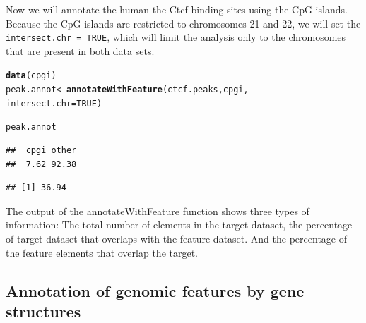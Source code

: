 \documentclass{article}\usepackage[]{graphicx}\usepackage[]{color}
\makeatletter
\newcommand{\hlnum}[1]{\textcolor[rgb]{0.686,0.059,0.569}{#1}}%
\newcommand{\hlstd}[1]{\textcolor[rgb]{0.345,0.345,0.345}{#1}}%
\newcommand{\hlkwb}[1]{\textcolor[rgb]{0.69,0.353,0.396}{#1}}%
\newcommand{\hlkwc}[1]{\textcolor[rgb]{0.333,0.667,0.333}{#1}}%
\newcommand{\hlkwd}[1]{\textcolor[rgb]{0.737,0.353,0.396}{\textbf{#1}}}%
\newenvironment{kframe}{%
 \def\at@end@of@kframe{}%
 \ifinner\ifhmode%
  \def\at@end@of@kframe{\end{minipage}}%
  \begin{minipage}{\columnwidth}%
 \fi\fi%
 \def\FrameCommand##1{\hskip\@totalleftmargin \hskip-\fboxsep
 \colorbox{shadecolor}{##1}\hskip-\fboxsep
     \hskip-\linewidth \hskip-\@totalleftmargin \hskip\columnwidth}%
 \MakeFramed {\advance\hsize-\width
   \@totalleftmargin\z@ \linewidth\hsize
   \@setminipage}}%
 {\par\unskip\endMakeFramed%
 \at@end@of@kframe}
\newenvironment{knitrout}{}{} %
\newcommand{\Rcode}[1]{{\texttt{#1}}}
\makeatother
\begin{document}
Now we will annotate the human the Ctcf binding sites using the CpG islands.
Because the CpG islands are restricted to chromosomes 21 and 22, we will set the
\Rcode{intersect.chr = TRUE}, which will limit the analysis only to the 
chromosomes that are present in both data sets.
\begin{knitrout}
\color{fgcolor}\begin{kframe}
\begin{alltt}
\hlkwd{data}\hlstd{(cpgi)}
\hlstd{peak.annot} \hlkwb{<-} \hlkwd{annotateWithFeature}\hlstd{(ctcf.peaks, cpgi,}
    \hlkwc{intersect.chr} \hlstd{=} \hlnum{TRUE}\hlstd{)}
\end{alltt}


{\ttfamily\noindent\itshape\color{messagecolor}{\#\# intersecting chromosomes...}}\begin{alltt}
\hlstd{peak.annot}
\end{alltt}


{\ttfamily\noindent\itshape\color{messagecolor}{\#\# summary of target set annotation with feature annotation:\\\#\# Rows in target set: 3964\\\#\# ----------------------------\\\#\# percentage of target elements overlapping with features:}}\begin{verbatim}
##  cpgi other 
##  7.62 92.38
\end{verbatim}


{\ttfamily\noindent\itshape\color{messagecolor}{\#\# \\\#\# percentage of feature elements overlapping with target:}}\begin{verbatim}
## [1] 36.94
\end{verbatim}


{\ttfamily\noindent\itshape\color{messagecolor}{\#\# }}\end{kframe}
\end{knitrout}


The output of the annotateWithFeature function shows three types of information:
The total number of elements in the target dataset, the percentage of target 
dataset that overlaps with the feature dataset. And the percentage of the feature
elements that overlap the target.

\subsection{Annotation of genomic features by gene structures}
\end{document}
